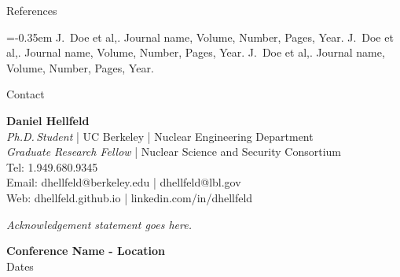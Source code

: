 \documentclass[a0paper,portrait]{baposter}
\begin{document}
\begin{poster}
\begin{posterbox}[name=refs,column=2,below=box6, height=0.158]{References}
\begin{thebibliography}{1}  %

\itemsep=-0.35em  %
\scriptsize
\bibitem{} J.~Doe et al,. Journal name, Volume, Number, Pages, Year.
\bibitem{} J.~Doe et al,. Journal name, Volume, Number, Pages, Year.
\bibitem{} J.~Doe et al,. Journal name, Volume, Number, Pages, Year.
\end{thebibliography}

\end{posterbox}





\begin{posterbox}[name=contact,column=2,below=refs, height=0.079]{Contact}

\vspace{0.1em}
\textbf{Daniel Hellfeld} \\[0.2em]
\scriptsize{
\emph{Ph.D.\,Student} | UC Berkeley | Nuclear Engineering Department \\
\emph{Graduate Research Fellow} | Nuclear Science and Security Consortium \\
Tel: 1.949.680.9345 \\
Email: dhellfeld@berkeley.edu | dhellfeld@lbl.gov \\
Web: dhellfeld.github.io | linkedin.com/in/dhellfeld
}\par
\end{posterbox}





\begin{posterbox}[name=ack,column=1,span=2,below=box5, above=bottom, headerColorOne=aaublue3, borderColor=aaublue3, boxColorOne=aaublue3, boxheaderheight=-1em]{}

\scriptsize{
\emph{Acknowledgement statement goes here.}
}\par
\end{posterbox}




\begin{posterbox}[name=titledate,column=0,span=1,below=box5, above=bottom, headerColorOne=aaublue3, borderColor=aaublue3, boxColorOne=aaublue3, boxheaderheight=-1em]{}

\begin{center}
\textbf{Conference Name - Location} \\
Dates
\end{center}

\end{posterbox}



\end{poster}
\end{document}
